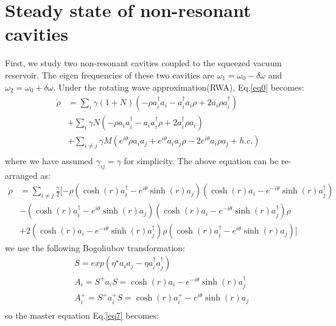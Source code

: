 \documentclass[aps,showpacs,onecolumn,twoside,groupedaddress]{revtex4}
\begin{document}
\section{Steady state of non-resonant cavities}
First, we study two non-resonant cavities coupled to the squeezed vacuum reservoir. The eigen frequencies of these two cavities are $\omega_1=\omega_0-\delta \omega$ and $\omega_2=\omega_0+\delta \omega$. Under the rotating wave approximation(RWA), Eq.\eqref{eq0} becomes:
\begin{equation}
\label{eq6}
\begin{split}
\dot{\rho}&=\sum_{i}\gamma(1+N)(-\rho a_{i}^{\dagger}a_{i}-a_{i}^{\dagger}a_{i}\rho+2a_{i}\rho a_{i}^{\dagger})\\
&+\sum_{i}\gamma N(-\rho a_{i}a_{i}^{\dagger}-a_{i}a_{i}^{\dagger}\rho+2a_{i}^{\dagger}\rho a_{i})\\
&+\sum_{i\ne j}\gamma M(e^{i\theta}\rho a_{i}a_{j}+e^{i\theta}a_{i}a_{j}\rho-2e^{i\theta}a_{i}\rho a_{j}+h.c.)\\
\end{split}
\end{equation}
where we have assumed $\gamma_{ij}=\gamma$ for simplicity. The above equation can be re-arranged as:
\begin{equation}
\label{eq7}
\begin{split}
\dot{\rho}&=\sum_{i\ne j}\frac{\gamma}{2}[-\rho(\cosh(r)a_{i}^{\dagger}-e^{i\theta}\sinh(r)a_{j})(\cosh(r)a_{i}-e^{-i\theta}\sinh(r)a_{j}^{\dagger})\\
&-(\cosh(r)a_{i}^{\dagger}-e^{i\theta}\sinh(r)a_{j})(\cosh(r)a_{i}-e^{-i\theta}\sinh(r)a_{j}^{\dagger})\rho\\
&+2(\cosh(r)a_{i}-e^{-i\theta}\sinh(r)a_{j}^{\dagger})\rho(\cosh(r)a_{i}^{\dagger}-e^{i\theta}\sinh(r)a_{j})]
\end{split}
\end{equation}
we use the following Bogoliubov transformation\cite{Bogoliubov}:
\begin{equation}
\label{eq8}
\begin{split}
&S=exp(\eta^{\star}a_{i}a_{j}-\eta a_{i}^{\dagger}a_{j}^{\dagger})\\
&A_{i}=S^{+}a_{i}S=\cosh(r)a_{i}-e^{-i\theta}\sinh(r)a_{j}^{\dagger} \\
&A_{i}^{+}=S^{+}a_{i}^{+}S=\cosh(r)a_{i}^{+}-e^{i\theta}\sinh(r)a_{j}\\
\end{split}
\end{equation}
so the master equation Eq.\eqref{eq7} becomes:
\end{document}
